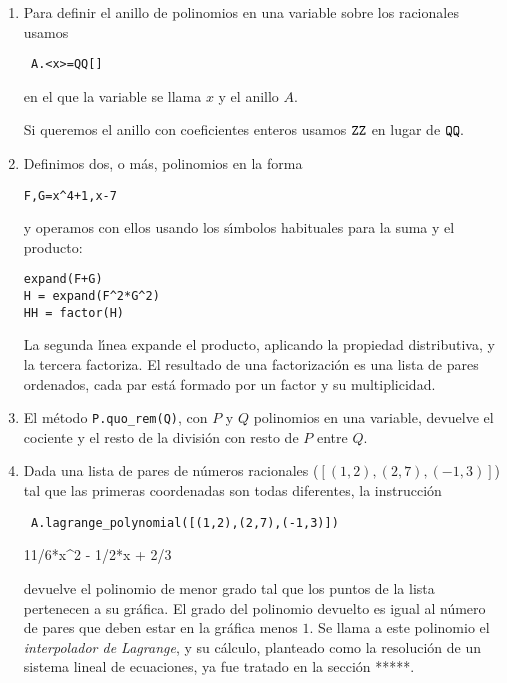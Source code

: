   \begin{enumerate}
 \item Para definir el anillo de polinomios en una variable sobre los racionales
usamos
\begin{lstlisting}
 A.<x>=QQ[]
\end{lstlisting}
\noindent en el que la variable se llama $x$ y el anillo $A$. 

Si queremos el anillo con coeficientes enteros usamos $\tt ZZ$ en lugar de $\tt
QQ.$
\item Definimos dos, o m\'as,  polinomios  en la forma 
\begin{lstlisting}
F,G=x^4+1,x-7
\end{lstlisting}

\noindent y operamos con ellos usando los s\'{\i}mbolos habituales para la suma
y el producto:
\begin{lstlisting}
expand(F+G)
H = expand(F^2*G^2)
HH = factor(H)
\end{lstlisting}
La segunda l\'{\i}nea expande el producto, aplicando la propiedad distributiva,
y la tercera factoriza.
El resultado de una factorizaci\'on es una lista de pares ordenados, cada par
est\'a formado por un factor y su multiplicidad. 
\item El m\'etodo \lstinline|P.quo_rem(Q)|, con $P$ y $Q$ polinomios en una
variable,  devuelve el cociente y el resto de la divisi\'on con resto de $P$ 
entre
$Q$.

\item Dada una lista de pares de n\'umeros racionales ($[(1,2),(2,7),(-1,3)]$)
tal que las primeras coordenadas son todas diferentes,  la instrucci\'on
\begin{lstlisting}
 A.lagrange_polynomial([(1,2),(2,7),(-1,3)])
\end{lstlisting}
\begin{Output}
 11/6*x^2 - 1/2*x + 2/3
\end{Output}
\noindent devuelve el polinomio de menor grado tal que los puntos de la lista
pertenecen a su gr\'afica. El grado del polinomio devuelto es igual al n\'umero 
de
pares que deben estar en la gr\'afica menos $1$. Se llama a este polinomio el 
{\itshape interpolador de
Lagrange}, y su c\'alculo, planteado como la resoluci\'on de un sistema lineal
de ecuaciones, ya fue tratado en la secci\'on *****.  


\end{enumerate}

  
  
